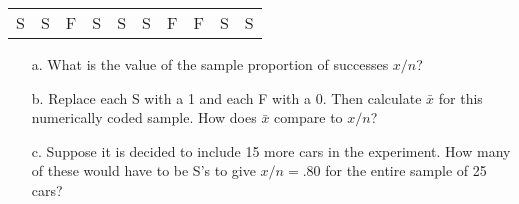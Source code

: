 \documentclass[letterpaper,12pt]{article}
\begin{document}
\begin{enumerate}
    \begin{center}
      \begin{tabular}{cccccccccc}
        S & S & F & S & S & S & F & F & S & S
      \end{tabular}
    \end{center}
    \begin{enumerate}
      \item[a.]
        What is the value of the sample proportion of successes $x/n$?
      \item[b.]
        Replace each S with a 1 and each F with a 0. Then calculate $\bar{x}$ for this numerically coded sample. How does $\bar{x}$ compare to $x/n$?
      \item[c.]
        Suppose it is decided to include 15 more cars in the experiment. How many of these would have to be S's to give $x/n = .80$ for the entire sample of 25 cars?
    \end{enumerate}
\end{enumerate}
\end{document}
